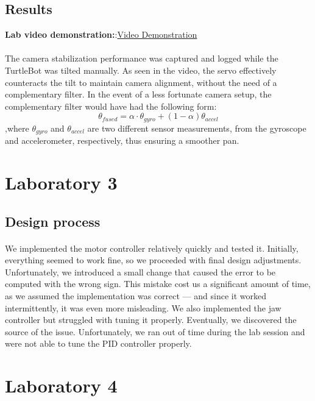 \documentclass[english]{article}
\begin{document}
    \subsection{Results}
    \textbf{Lab video demonstration:}:\href{https://youtube.com/shorts/imY0JJ4vP6Q?feature=share}{Video Demonstration}
    \paragraph{}
    The camera stabilization performance was captured and logged while the TurtleBot was tilted manually. As seen in the video, the servo effectively counteracts the tilt to maintain camera alignment, without the need of a complementary filter. In the event of a less fortunate camera setup, the complementary filter would have had the following form:
    \begin{equation}
        \theta_{fused} = \alpha \cdot\theta_{gyro} + (1 - \alpha) \theta_{accel}
    \end{equation}
    ,where $\theta_{gyro}$ and $\theta_{accel}$ are two different sensor measurements, from the gyroscope and accelerometer, respectively, thus ensuring a smoother pan.
    

\section{Laboratory 3}
		\subsection{Design process}
			\paragraph{}
			We implemented the motor controller relatively quickly and tested it. 
			Initially, everything seemed to work fine, so we proceeded with final design adjustments. 
			Unfortunately, we introduced a small change that caused the error to be computed with the
			wrong sign. This mistake cost us a significant amount of time, as we assumed the 
			implementation was correct — and since it worked intermittently, it was even more misleading. 
			We also implemented the jaw controller but struggled with tuning it properly. 
			Eventually, we discovered the source of the issue. 
			Unfortunately, we ran out of time during the lab session and were not able to tune the PID controller properly.
\section{Laboratory 4}
\end{document}

